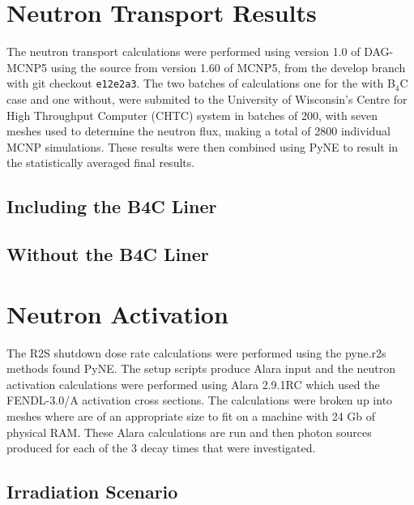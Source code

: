 \documentclass[12pt]{article}
\begin{document}
\section{Neutron Transport Results}
The neutron transport calculations were performed using version 1.0 of DAG-MCNP5 using the source from version 1.60 of MCNP5, from the develop branch with git checkout \texttt{e12e2a3}. The two batches of calculations one for the with B$_4$C case and one without,  were submited to the University of Wisconsin's Centre for High Throughput Computer (CHTC) system in batches of 200, with seven meshes used to determine the neutron flux, making a total of 2800 individual MCNP simulations. These results were then combined using PyNE to result in the statistically averaged final results.
\subsection{Including the B4C Liner}
\subsection{Without the B4C Liner}
\section{Neutron Activation}
The R2S shutdown dose rate calculations were performed using the pyne.r2s methods found PyNE. The setup scripts produce Alara input
and the neutron activation calculations were performed using Alara 2.9.1RC which used the FENDL-3.0/A activation cross sections.
The calculations were broken up into meshes where are of an appropriate size to fit on a machine with 24 Gb of physical RAM. These
Alara calculations are run and then photon sources produced for each of the 3 decay times that were investigated.

\subsection{Irradiation Scenario}
\end{document}
